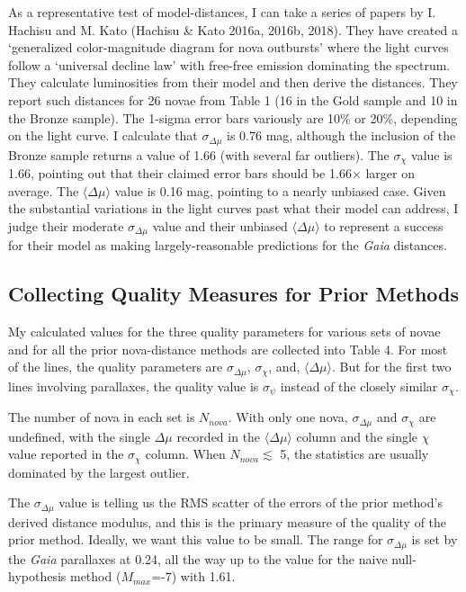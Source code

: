 \documentclass[a4paper,fleqn,usenatbib]{mnras}
\begin{document}
As a representative test of model-distances, I can take a series of papers by I. Hachisu and M. Kato (Hachisu \& Kato 2016a, 2016b, 2018).  They have created a `generalized color-magnitude diagram for nova outbursts' where the light curves follow a `universal decline law' with free-free emission dominating the spectrum.  They calculate luminosities from their model and then derive the distances.  They report such distances for 26 novae from Table 1 (16 in the Gold sample and 10 in the Bronze sample).  The 1-sigma error bars variously are 10\% or 20\%, depending on the light curve.  I calculate that $\sigma_{\Delta \mu}$ is 0.76 mag, although the inclusion of the Bronze sample returns a value of 1.66 (with several far outliers).  The $\sigma_{\chi}$ value is 1.66, pointing out that their claimed error bars should be 1.66$\times$ larger on average.  The $\langle \Delta \mu \rangle$ value is 0.16 mag, pointing to a nearly unbiased case.  Given the substantial variations in the light curves past what their model can address, I judge their moderate $\sigma_{\Delta \mu}$ value and their unbiased $\langle \Delta \mu \rangle$ to represent a success for their model as making largely-reasonable predictions for the {\it Gaia} distances.

\subsection{Collecting  Quality Measures for Prior Methods}

My calculated values for the three quality parameters for various sets of novae and for all the prior nova-distance methods are collected into Table 4.  For most of the lines, the quality parameters are $\sigma_{\Delta \mu}$, $\sigma_{\chi}$, and, $\langle \Delta \mu \rangle$.  But for the first two lines involving parallaxes, the quality value is $\sigma_{\psi}$ instead of the closely similar $\sigma_{\chi}$.

The number of nova in each set is $N_{nova}$.  With only one nova, $\sigma_{\Delta \mu}$ and $\sigma_{\chi}$ are undefined, with the single $\Delta \mu$ recorded in the $\langle \Delta \mu \rangle$ column and the single $\chi$ value reported in the $\sigma_{\chi}$ column.  When $N_{nova} \lesssim$ 5, the statistics are usually dominated by the largest outlier.  

The $\sigma_{\Delta \mu}$ value is telling us the RMS scatter of the errors of the prior method's derived distance modulus, and this is the primary measure of the quality of the prior method.  Ideally, we want this value to be small.  The range for $\sigma_{\Delta \mu}$ is set by the {\it Gaia} parallaxes at 0.24, all the way up to the value for the naive null-hypothesis method ($M_{max}$=-7) with 1.61.
\end{document}
